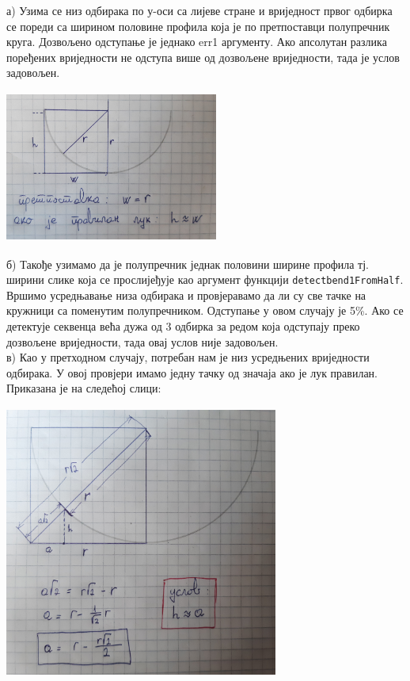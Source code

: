 \documentclass[12pt]{article}
\begin{document}
а) Узима се низ одбирака по у-оси са лијеве стране и вриједност првог одбирка се пореди са ширином половине профила која је по претпоставци полупречник круга. Дозвољено одступање је једнако err1 аргументу. Ако апсолутан разлика поређених вриједности не одступа више од дозвољене вриједности, тада је услов задовољен. \vspace{0.5cm}
\begin{center}
    \centering 
    \includegraphics[height=5cm, width=7cm]{images/detect1.jpg}
\end{center}
\vspace{0.5cm}
б) Такође узимамо да је полупречник једнак половини ширине профила тј. ширини слике која се прослијеђује као аргумент функцији \texttt{detectbend1FromHalf}. Вршимо усредњавање низа одбирака и провјеравамо да ли су све тачке на кружници са поменутим полупречником. Одступање у овом случају је 5\%. Ако се детектује секвенца већа дужа од 3 одбирка за редом која одступају преко дозвољене вриједности, тада овај услов није задовољен.\\
в) Као у претходном случају, потребан нам је низ усредњених вриједности одбирака. У овој провјери имамо једну тачку од значаја ако је лук правилан. Приказана је на следећој слици:
\vspace{0.5cm}
\begin{center}
    \centering 
    \includegraphics[height=9cm, width=9cm]{images/detect2.jpg}
\end{center}
\vspace{0.5cm}
\end{document}

